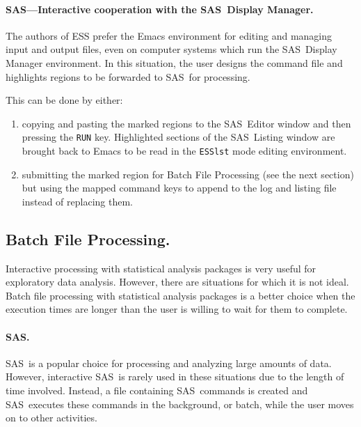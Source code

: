 \documentclass{article}
\newcommand*{\SAS}{\textsc{SAS}}
\newcommand{\stexttt}[1]{{\small\texttt{#1}}}
\begin{document}
\paragraph{\SAS---Interactive cooperation with the \SAS\ Display Manager.}

The authors of ESS prefer the Emacs environment for editing and
managing input and output files, even on computer systems which run
the \SAS\ Display Manager environment.  In this situation, the user
designs the command file and highlights regions to be forwarded to
\SAS\ for processing.

This can be done by either:
\begin{enumerate}
\item copying and pasting the marked regions to the \SAS\ Editor window
  and then pressing the \stexttt{RUN} key.  Highlighted sections of
  the \SAS\ Listing window are brought back to Emacs to be read in the
  \stexttt{ESSlst} mode editing environment.
\item submitting the marked region for Batch File Processing (see the
  next section) but using the mapped command keys to append to the log
  and listing file instead of replacing them.
\end{enumerate}

\subsection{Batch File Processing.}
\label{sec:batch-file}

Interactive processing with statistical analysis packages is very
useful for exploratory data analysis.%
However, there are %
situations for which it is not ideal.  Batch file processing with
statistical analysis packages is a better choice when the execution times 
are longer than the user is willing to wait for them to complete.

\paragraph{\SAS.}
\label{sec:sas-batch}

\SAS\ is a popular choice for processing and analyzing large amounts
of data.  However, interactive \SAS\ is rarely used in these situations
due to the length of time involved.  Instead, a file containing \SAS\ 
commands is created and \SAS\ executes these commands in the background, 
or batch, while the user moves on to other activities.
\end{document}
